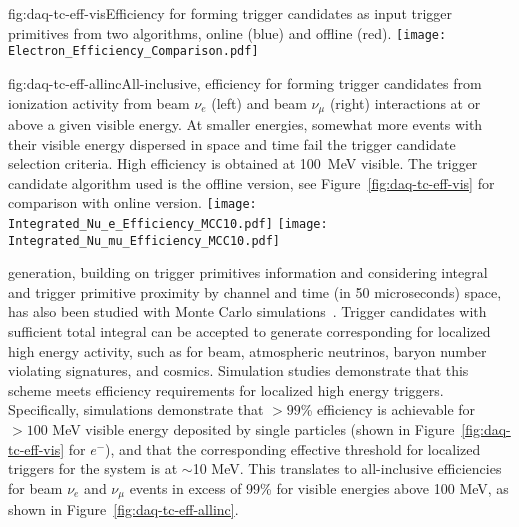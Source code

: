 \begin{dunefigure}{fig:daq-tc-eff-vis}{Efficiency for forming trigger candidates as input trigger primitives from two algorithms, online (blue) and offline (red).}
  \texttt{[image: Electron\_Efficiency\_Comparison.pdf]}
\end{dunefigure}

\begin{dunefigure}{fig:daq-tc-eff-allinc}{All-inclusive, efficiency for
    forming trigger candidates from ionization activity from beam $\nu_e$
    (left) and beam $\nu_\mu$ (right) interactions at or above a given
    visible energy. 
    At smaller energies, somewhat more events with their visible energy
    dispersed in space and time fail the trigger candidate selection
    criteria. 
    High efficiency is obtained at \SI{100}{\MeV} visible. 
    The trigger candidate algorithm used is the offline version, see
    Figure~\ref{fig:daq-tc-eff-vis} for comparison with online version.}
  \texttt{[image: Integrated\_Nu\_e\_Efficiency\_MCC10.pdf]}%
  \texttt{[image: Integrated\_Nu\_mu\_Efficiency\_MCC10.pdf]}
\end{dunefigure}


 generation, building on trigger primitives information
and considering integral  and trigger primitive proximity by channel
and time (in 50 microseconds) space, has also been studied with Monte
Carlo simulations~\cite{bib:docdb11215}.
Trigger candidates with sufficient total integral   can be accepted to
generate corresponding  for localized high energy
activity, such as for beam, atmospheric neutrinos, baryon number
violating signatures, and cosmics.
Simulation studies demonstrate that this scheme meets efficiency
requirements for localized high energy triggers.
Specifically, simulations demonstrate that $>99$\% efficiency is
achievable for $>100$ MeV visible energy deposited by single particles
(shown in Figure~\ref{fig:daq-tc-eff-vis} for $e^-$), and that the
corresponding effective threshold for localized triggers for the system
is at $\sim$10 MeV. This translates to all-inclusive efficiencies for
beam $\nu_e$ and $\nu_\mu$ events in excess of 99\% for visible energies
above 100 MeV, as shown in Figure~\ref{fig:daq-tc-eff-allinc}.

